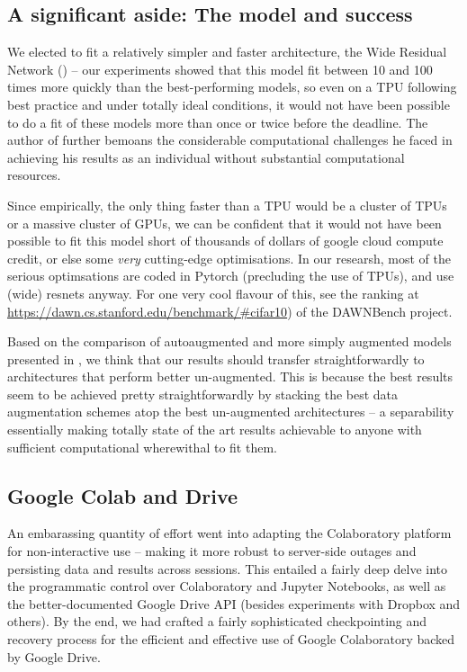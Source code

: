 \documentclass[10pt,twocolumn,letterpaper]{article}
\begin{document}
\subsection{A significant aside: The model and success}
We elected to fit a relatively simpler and faster architecture, the Wide Residual Network (\cite{Zagoruyko2016}) -- our experiments showed that this model fit between 10 and 100 times more quickly than the best-performing models, so even on a TPU following best practice and under totally ideal conditions, it would not have been possible to do a fit of these models more than once or twice before the deadline. The author of \cite{Gastaldi2017} further bemoans the considerable computational challenges he faced in achieving his results as an individual without substantial computational resources.

Since empirically, the only thing faster than a TPU would be a cluster of TPUs or a massive cluster of GPUs, we can be confident that it would not have been possible to fit this model short of thousands of dollars of google cloud compute credit, or else some \emph{very} cutting-edge optimisations. In our researsh, most of the serious optimsations are coded in Pytorch (precluding the use of TPUs), and use (wide) resnets anyway. For one very cool flavour of this, see the ranking at \url{https://dawn.cs.stanford.edu/benchmark/#cifar10}) of the \cite{Coleman2017} DAWNBench project.

Based on the comparison of autoaugmented and more simply augmented models presented in \cite{Cubuk2018}, we think that our results should transfer straightforwardly to architectures that perform better un-augmented. This is because the best results seem to be achieved pretty straightforwardly by stacking the best data augmentation schemes atop the best un-augmented architectures -- a separability essentially making totally state of the art results achievable to anyone with sufficient computational wherewithal to fit them.


\subsection{Google Colab and Drive}
An embarassing quantity of effort went into adapting the Colaboratory platform for non-interactive use -- making it more robust to server-side outages and persisting data and results across sessions. This entailed a fairly deep delve into the programmatic control over Colaboratory and Jupyter Notebooks, as well as the better-documented Google Drive API (besides experiments with Dropbox and others). By the end, we had crafted a fairly sophisticated checkpointing and recovery process for the efficient and effective use of Google Colaboratory backed by Google Drive. 
\end{document}
